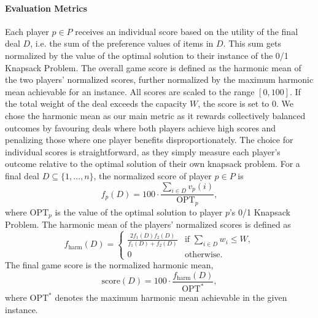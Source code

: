 \paragraph{Evaluation Metrics}
Each player $p \in P$ receives an individual score based on the utility of the final deal $D$, i.e. the sum of the preference values of items in $D$. This sum gets normalized by the value of the optimal solution to their instance of the 0/1 Knapsack Problem. The overall game score is defined as the harmonic mean of the two players’ normalized scores, further normalized by the maximum harmonic mean achievable for an instance. All scores are scaled to the range $[0,100]$. If the total weight of the deal exceeds the capacity $W$, the score is set to $0$. We chose the harmonic mean as our main metric 
as it rewards collectively balanced outcomes by favouring deals where both players achieve high scores and penalizing those where one player benefits disproportionately. 
The choice for individual scores is straightforward, as they simply measure each player’s outcome relative to the optimal solution of their own knapsack problem.
For a final deal $D \subseteq \{1,\dots,n\}$, the normalized score of player $p \in P$ is  
$$
f_p(D) = 100 \cdot \frac{\sum_{i \in D} v_p(i)}{\text{OPT}_p},
$$  
where $\text{OPT}_p$ is the value of the optimal solution to player $p$'s 0/1 Knapsack Problem.  
The harmonic mean of the players' normalized scores is defined as  
$$
f_{\text{harm}}(D) =
\begin{cases}
\frac{2 f_{1}(D) f_{2}(D)}{f_{1}(D) + f_{2}(D)} & \text{if } \sum_{i \in D} w_i \leq W, \\
0 & \text{otherwise}.
\end{cases}
$$  
The final game score is the normalized harmonic mean, 
$$
\text{score}(D) = 100 \cdot \frac{f_{\text{harm}}(D)}{\text{OPT}^*},
$$  
where $\text{OPT}^*$ denotes the maximum harmonic mean achievable in the given instance.
